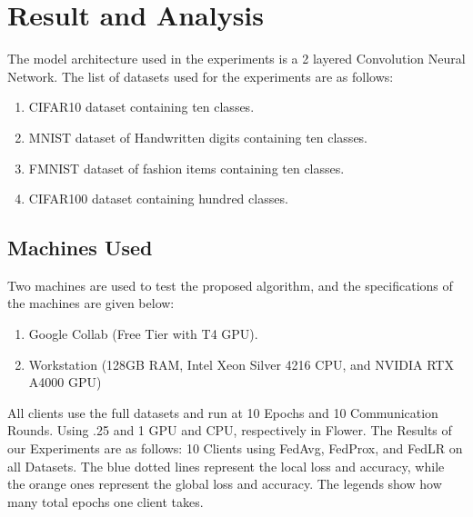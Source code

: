 \documentclass[conference]{IEEEtran}
\begin{document}
\section{Result and Analysis}
The model architecture used in the experiments is a 2 layered Convolution Neural Network. The list of datasets used for the experiments are as follows:
\begin{enumerate}
    \item CIFAR10 \cite{cifar10} dataset containing ten classes.
    \item MNIST \cite{lecun1998mnist} dataset of Handwritten digits containing ten classes. 
    \item FMNIST \cite{xiao2017fashionmnistnovelimagedataset} dataset of fashion items containing ten classes.
    \item CIFAR100 \cite{Krizhevsky09learningmultiple} dataset containing hundred classes. 
\end{enumerate}
\subsection{Machines Used}
Two machines are used to test the proposed algorithm, and the specifications of the machines are given below:
\begin{enumerate}
	\item Google Collab (Free Tier with T4 GPU).
	\item Workstation (128GB RAM, Intel Xeon Silver 4216 CPU, and NVIDIA RTX A4000 GPU)
\end{enumerate}

All clients use the full datasets and run at 10 Epochs and 10 Communication Rounds. Using .25 and 1 GPU and CPU, respectively in Flower. The Results of our Experiments are as follows:
10 Clients using FedAvg, FedProx, and FedLR on all Datasets. The blue dotted lines represent the local loss and accuracy, while the orange ones represent the global loss and accuracy. The legends show how many total epochs one client takes.
\end{document}
